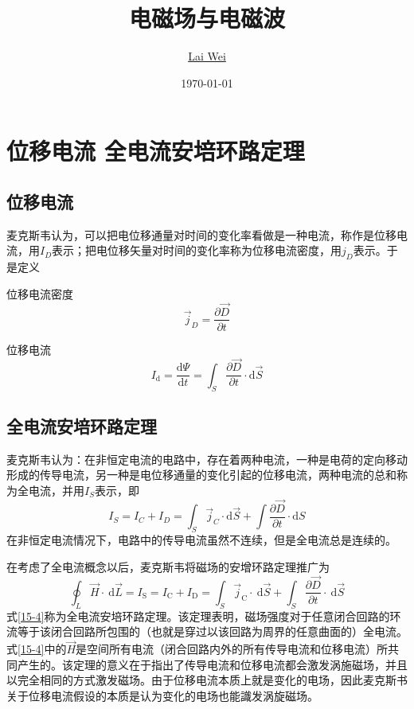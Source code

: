 \documentclass[12pt]{article}
\title{电磁场与电磁波}
\author{\href{mailto:lai-wei@whu.edu.cn}{Lai Wei}}
\date{\today}
\newcommand{\rmd}{\mathrm{d}}
\newcommand{\deriv}[2]{\frac{\rmd #1}{\rmd #2}}
\newcommand{\pderiv}[2]{\frac{\partial #1}{\partial #2}}
\begin{document}
\maketitle

\section{位移电流 \quad 全电流安培环路定理}

\subsection{位移电流}

麦克斯韦认为，可以把电位移通量对时间的变化率看做是一种电流，称作是位移电流，用\(I_D\)表示；把电位移矢量对时间的变化率称为位移电流密度，用\(j_D\)表示。于是定义

位移电流密度
\begin{equation}
    \overrightarrow{j}_D = \pderiv{\overrightarrow{D}}{t}
\end{equation}

位移电流
\begin{equation}
I_{\mathrm{d}}=\deriv{\varPsi}{t} = \int_S \pderiv{\overrightarrow{D}}{t} \cdot \rmd \overrightarrow{S}
\end{equation}

\subsection{全电流安培环路定理}

麦克斯韦认为：在非恒定电流的电路中，存在着两种电流，一种是电荷的定向移动形成的传导电流，另一种是电位移通量的变化引起的位移电流，两种电流的总和称为全电流，并用\(I_S\)表示，即
\begin{equation}
    I_S = I_C + I_D = \int_S \overrightarrow{j}_C \cdot \rmd \overrightarrow{S} + \int \pderiv{\overrightarrow{D}}{t} \cdot \rmd S
\end{equation}
在非恒定电流情况下，电路中的传导电流虽然不连续，但是全电流总是连续的。

在考虑了全电流概念以后，麦克斯韦将磁场的安增环路定理推广为
\begin{equation}
\oint_L \overrightarrow{H} \cdot \mathrm{~d} \overrightarrow{L}=I_{\mathrm{S}}=I_{\mathrm{C}}+I_{\mathrm{D}}=\int_S \overrightarrow{j}_{\mathrm{C}} \cdot \mathrm{~d} \overrightarrow{S}+\int_S \frac{\partial \overrightarrow{D}}{\partial t} \cdot \mathrm{~d} \overrightarrow{S}
\label{15-4}
\end{equation}
式\ref{15-4}称为全电流安培环路定理。该定理表明，磁场强度对于任意闭合回路的环流等于该闭合回路所包围的（也就是穿过以该回路为周界的任意曲面的）全电流。式\ref{15-4}中的\(\overrightarrow{H}\)是空间所有电流（闭合回路内外的所有传导电流和位移电流）所共同产生的。该定理的意义在于指出了传导电流和位移电流都会激发涡施磁场，并且以完全相同的方式激发磁场。由于位移电流本质上就是变化的电场，因此麦克斯书关于位移电流假设的本质是认为变化的电场也能識发涡旋磁场。
\end{document}
